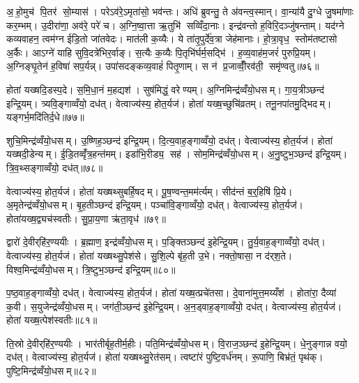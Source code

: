 अ॒हो॒मुच॑ पि॒तर॑ सो॒म्यास॑। परेऽव॑रे॒ऽमृता॑सो॒ भव॑न्तः। अधि॑ ब्रुवन्तु॒ ते अ॑वन्त्व॒स्मान्। वा॒न्या॑यै दु॒ग्धे जु॒षमा॑णाः कर॒म्भम्। उ॒दीरा॑णा॒ अव॑रे॒ परे॑ च। अ॒ग्नि॒ष्वा॒त्ता ऋ॒तुभि॑ सव्विँदा॒नाः। इन्द्र॑वन्तो ह॒विरि॒दञ्जु॑षन्ताम्। यद॑ग्ने कव्यवाहन॒ त्वम॑ग्न ईडि॒तो जा॑तवेदः। मात॑ली क॒व्यैः। ये ता॑तृ॒पुर्दे॑व॒त्रा जेह॑मानाः। हो॒त्रा॒वृध॒ स्तोम॑तष्टासो अ॒र्कैः। आऽग्ने॑ याहि सुवि॒दत्रे॑भिर॒र्वाङ्। स॒त्यैः क॒व्यैः पि॒तृभि॑र्घर्म॒सद्भि॑। ह॒व्य॒वाह॑म॒जरं॑ पुरुप्रि॒यम्। अ॒ग्निङ्घृ॒तेन॑ ह॒विषा॑ सप॒र्यन्न्। उपा॑सदङ्कव्य॒वाहं॑ पितृ॒णाम्। स न॑ प्र॒जाव्वीँ॒रव॑ती॒ समृ॑ण्वतु॥७६॥\anuvakamend[अन॑ग्निष्वात्ता॒ जेह॑मानास्स॒प्त च॑]

होता॑ यख्षदि॒डस्प॒दे। स॒मि॒धा॒नं म॒हद्यश॑। सुष॑मिद्धं॒ वरेण्यम्। अ॒ग्निमिन्द्र॑व्वँयो॒धसम्। गा॒य॒त्रीञ्छन्द॑ इन्द्रि॒यम्। त्र्यवि॒ङ्गाव्वँयो॒ दध॑त्। वेत्वाज्य॑स्य॒ होत॒र्यज॑। होता॑ यख्ष॒च्छुचि॑व्रतम्। तनू॒नपा॑तमु॒द्भिदम्। यङ्गर्भ॒मदि॑तिर्द॒धे॥७७॥

शुचि॒मिन्द्र॑व्वँयो॒धसम्। उ॒ष्णिह॒ञ्छन्द॑ इन्द्रि॒यम्। दि॒त्य॒वाह॒ङ्गाव्वँयो॒ दध॑त्। वेत्वाज्य॑स्य॒ होत॒र्यज॑। होता॑ यख्षदी॒डेन्यम्। ई॒डि॒तव्वृँ॑त्र॒हन्त॑मम्। इडा॑भि॒रीड्य॒ सह॑। सोम॒मिन्द्र॑व्वँयो॒धसम्। अ॒नु॒ष्टुभ॒ञ्छन्द॑ इन्द्रि॒यम्। त्रि॒व॒थ्सङ्गाव्वँयो॒ दध॑त्॥७८॥

वेत्वाज्य॑स्य॒ होत॒र्यज॑। होता॑ यख्षथ्सुबर्\mbox{}हि॒षदम्। पू॒ष॒ण्वन्त॒मम॑र्त्यम्। सीद॑न्तं ब॒र्॒हिषि॑ प्रि॒ये। अ॒मृतेन्द्र॑व्वँयो॒धसम्। बृ॒ह॒तीञ्छन्द॑ इन्द्रि॒यम्। पञ्चा॑वि॒ङ्गाव्वँयो॒ दध॑त्। वेत्वाज्य॑स्य॒ होत॒र्यज॑। होता॑यख्ष॒द्व्यच॑स्वतीः। सु॒प्रा॒य॒णा ऋ॑ता॒वृध॑॥७९॥

द्वारो॑ दे॒वीर्‌हि॑र॒ण्ययीः। ब्र॒ह्माण॒ इन्द्र॑व्वँयो॒धसम्। प॒ङ्क्तिञ्छन्द॑ इ॒हेन्द्रि॒यम्। तु॒र्य॒वाह॒ङ्गाव्वँयो॒ दध॑त्। वेत्वाज्य॑स्य॒ होत॒र्यज॑। होता॑ यख्षथ्सु॒पेश॑से। सु॒शि॒ल्पे बृ॑ह॒ती उ॒भे। नक्तो॒षासा॒ न द॑र्‌श॒ते। विश्व॒मिन्द्र॑व्वँयो॒धसम्। त्रि॒ष्टुभ॒ञ्छन्द॑ इन्द्रि॒यम्॥८०॥

प॒ष्ठ॒वाह॒ङ्गाव्वँयो॒ दध॑त्। वेत्वाज्य॑स्य॒ होत॒र्यज॑। होता॑ यख्ष॒त्प्रचे॑तसा। दे॒वाना॑मुत्त॒मय्यँश॑। होता॑रा॒ दैव्या॑ क॒वी। स॒युजेन्द्र॑व्वँयो॒धसम्। जग॑ती॒ञ्छन्द॑ इ॒हेन्द्रि॒यम्। अ॒न॒ड्वाह॒ङ्गाव्वँयो॒ दध॑त्। वेत्वाज्य॑स्य॒ होत॒र्यज॑। होता॑ यख्ष॒त्पेश॑स्वतीः॥८१॥

ति॒स्रो दे॒वीर्‌हि॑र॒ण्ययीः। भार॑तीर्बृह॒तीर्म॒हीः। पति॒मिन्द्र॑व्वँयो॒धसम्। वि॒राज॒ञ्छन्द॑ इ॒हेन्द्रि॒यम्। धे॒नुङ्गान्न वयो॒ दध॑त्। वेत्वाज्य॑स्य॒ होत॒र्यज॑। होता॑ यख्षथ्सु॒रेत॑सम्। त्वष्टा॑रं पुष्टि॒वर्ध॑नम्। रू॒पाणि॒ बिभ्र॑तं॒ पृथ॑क्। पुष्टि॒मिन्द्र॑व्वँयो॒धसम्॥८२॥

